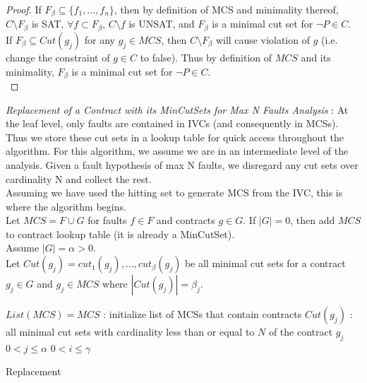 \begin{theorem}
\begin{proof}
If $F_\beta \subseteq \{f_1, ..., f_n\}$, then by definition of MCS and minimality thereof, $C \setminus F_\beta$ is SAT, $\forall f \subset F_\beta$, $C \setminus f$ is UNSAT, and $F_\beta$ is a minimal cut set for $\neg P \in C$. \\

If $F_\beta \subseteq Cut(g_j)$ for any $g_j \in MCS$, then $C \setminus F_\beta$ will cause violation of $g$ (i.e. change the constraint of $g \in C$ to false). Thus by definition of $MCS$ and its minimality, $F_\beta$ is a minimal cut set for $\neg P \in C$. \\

\end{proof}
\end{theorem}

\textit{Replacement of a Contract with its MinCutSets for Max N Faults Analysis} : At the leaf level, only faults are contained in IVCs (and consequently in MCSs). Thus we store these cut sets in a lookup table for quick access throughout the algorithm. For this algorithm, we assume we are in an intermediate level of the analysis. Given a fault hypothesis of max N faults, we disregard any cut sets over cardinality N and collect the rest.\\

Assuming we have used the hitting set to generate MCS from the IVC, this is where the algorithm begins. \\

Let $MCS = F \cup G$ for faults $f \in F$ and contracts $g \in G$. If $|G| = 0$, then add $MCS$ to contract lookup table (it is already a MinCutSet). \\

Assume $|G| = \alpha > 0$.\\

Let $Cut(g_j) = {cut_1(g_j), ..., cut_{\beta}(g_j)}$ be all minimal cut sets for a contract $g_j \in G$ and $g_j \in MCS$ where $|Cut(g_j)|=\beta_j$.\\

\begin{algorithm}
	$List(MCS) = {MCS}$ : initialize list of MCSs that contain contracts \;
	$Cut(g_j)$ : all minimal cut sets with cardinality less than or equal to $N$ of the contract $g_j$ \;
	$0 < j \leq \alpha$ \;
	$0 < i \leq \gamma$ \;
	\caption{Replacement}
	\label{alg:repl_alg}
\end{algorithm}

